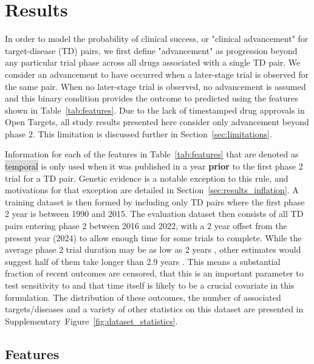 \documentclass{article}
\begin{document}
\section{Results}
\label{sec:results}

In order to model the probability of clinical success, or "clinical advancement" for target-disease (TD) pairs, we first define "advancement" as progression beyond any particular trial phase across all drugs associated with a single TD pair. We consider an advancement to have occurred when a later-stage trial is observed for the same pair. When no later-stage trial is observed, no advancement is assumed and this binary condition provides the outcome to predicted using the features shown in Table~\ref{tab:features}. Due to the lack of timestamped drug approvals in Open Targets, all study results presented here consider only advancement beyond phase 2. This limitation is discussed further in Section~\ref{sec:limitations}.

Information for each of the features in Table~\ref{tab:features} that are denoted as \colorbox{Gainsboro}{temporal} is only used when it was published in a year \textbf{prior} to the first phase 2 trial for a TD pair. Genetic evidence is a notable exception to this rule, and motivations for that exception are detailed in Section~\ref{sec:results_inflation}. A training dataset is then formed by including only TD pairs where the first phase 2 year is between 1990 and 2015. The evaluation dataset then consists of all TD pairs entering phase 2 between 2016 and 2022, with a 2 year offset from the present year (2024) to allow enough time for some trials to complete. While the average phase 2 trial duration may be as low as 2 years \cite{fdaStepClinical}, other estimates would suggest half of them take longer than 2.9 years \cite{PMID:29394327}. This means a substantial fraction of recent outcomes are censored, that this is an important parameter to test sensitivity to and that time itself is likely to be a crucial covariate in this formulation. The distribution of these outcomes, the number of associated targets/diseases and a variety of other statistics on this dataset are presented in Supplementary~Figure~\ref{fig:dataset_statistics}.

\subsection{Features}
\label{sec:features}
\end{document}
